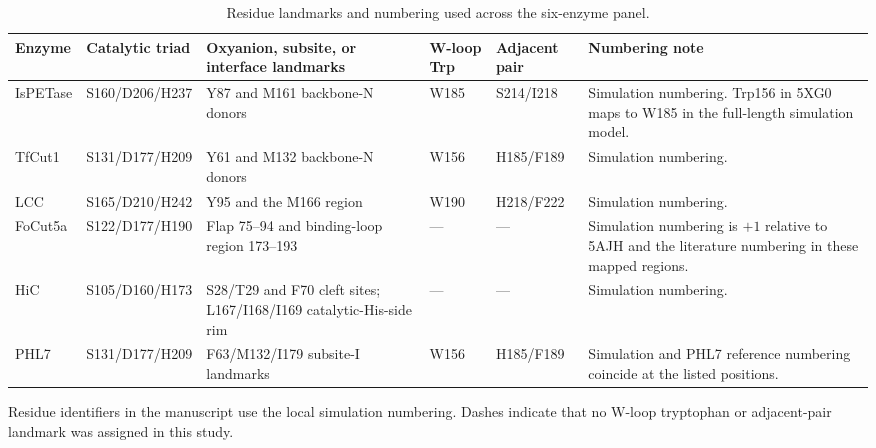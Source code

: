 \begin{table}[H]
  \caption{Residue landmarks and numbering used across the six-enzyme panel.}
  \label{tab:residue_correspondence}
  \scriptsize
  \setlength{\tabcolsep}{4pt}
  \begin{tabularx}{\linewidth}{@{}ll>{\raggedright\arraybackslash}Xll>{\raggedright\arraybackslash}X@{}}
    \toprule
    Enzyme & Catalytic triad & Oxyanion, subsite, or interface landmarks & W-loop Trp & Adjacent pair & Numbering note \\
    \midrule
    IsPETase & S160/D206/H237 & Y87 and M161 backbone-N donors & W185 & S214/I218 & Simulation numbering. Trp156 in 5XG0 maps to W185 in the full-length simulation model. \\
    TfCut1 & S131/D177/H209 & Y61 and M132 backbone-N donors & W156 & H185/F189 & Simulation numbering. \\
    LCC & S165/D210/H242 & Y95 and the M166 region & W190 & H218/F222 & Simulation numbering. \\
    FoCut5a & S122/D177/H190 & Flap 75--94 and binding-loop region 173--193 & --- & --- & Simulation numbering is $+1$ relative to 5AJH and the literature numbering in these mapped regions. \\
    HiC & S105/D160/H173 & S28/T29 and F70 cleft sites; L167/I168/I169 catalytic-His-side rim & --- & --- & Simulation numbering. \\
    PHL7 & S131/D177/H209 & F63/M132/I179 subsite-I landmarks & W156 & H185/F189 & Simulation and PHL7 reference numbering coincide at the listed positions. \\
    \bottomrule
  \end{tabularx}
  \par\vspace{2pt}
  \begin{minipage}{\linewidth}
    \footnotesize
    Residue identifiers in the manuscript use the local simulation numbering. Dashes indicate that no W-loop tryptophan or adjacent-pair landmark was assigned in this study.
  \end{minipage}
\end{table}
